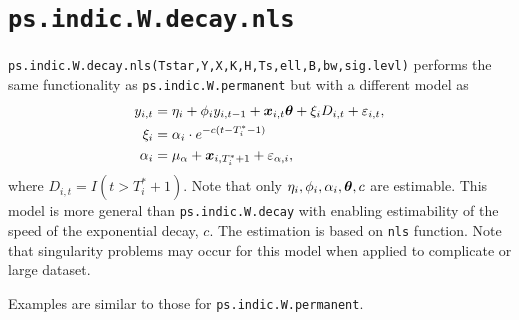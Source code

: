 \documentclass[12pt]{article}
\begin{document}
 \section{\texttt{ps.indic.W.decay.nls}}
 
 \texttt{ps.indic.W.decay.nls(Tstar,Y,X,K,H,Ts,ell,B,bw,sig.levl)} performs the same functionality as  \texttt{ps.indic.W.permanent} but with a different model as 
 \begin{align*}
 	y_{i,t} &= \eta_i + \phi_i y_{i, t-1}  + \boldsymbol{x}_{i, t}\boldsymbol{\theta} + \xi_i D_{i,t} + \varepsilon_{i,t},\\
 	\xi_i &= \alpha_i \cdot e^{-c(t-T_i^*-1)} \\
 	\alpha_i & = \mu_{\alpha} + \boldsymbol{x}_{i, T_i^*+1} + \varepsilon_{\alpha, i},
 \end{align*}
 where $D_{i,t}=I(t > T_i^*+1)$. Note that only $\eta_i, \phi_i, \alpha_i, \boldsymbol{\theta},c$ are estimable. This model  is more general than \texttt{ps.indic.W.decay} with enabling estimability of the speed of the exponential decay, $c$. The estimation is based on \texttt{nls} function. Note that singularity problems may occur for this model when applied to complicate or large dataset.
 
 Examples are similar to those for \texttt{ps.indic.W.permanent}.


\end{document}
